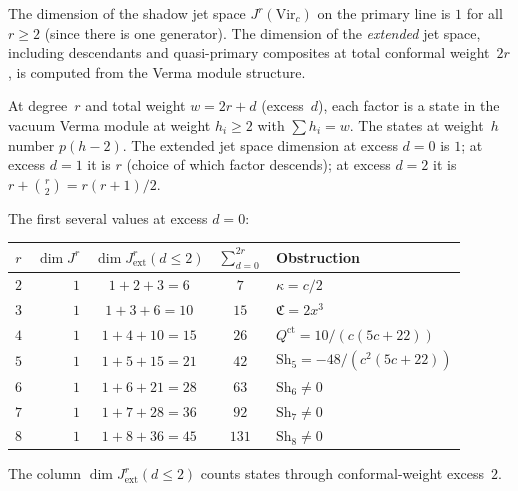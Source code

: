 \begin{computation}
The dimension of the shadow jet space $J^r(\mathrm{Vir}_c)$
on the primary line is $1$ for all $r \geq 2$ (since
there is one generator). The dimension of the
\emph{extended} jet space, including descendants and
quasi-primary composites at total conformal weight~$2r$,
is computed from the Verma module structure.

At degree~$r$ and total weight $w = 2r + d$ (excess~$d$),
each factor is a state in the vacuum Verma module at
weight $h_i \geq 2$ with $\sum h_i = w$. The states
at weight~$h$ number $p(h-2)$. The extended jet space
dimension at excess $d = 0$ is $1$; at excess $d = 1$ it
is $r$ (choice of which factor descends); at excess
$d = 2$ it is $r + \binom{r}{2} = r(r+1)/2$.

The first several values at excess $d = 0$:

\begin{center}
\renewcommand{\arraystretch}{1.4}
\begin{tabular}{crccl}
\toprule
$r$ & $\dim J^r$ & $\dim J^r_{\mathrm{ext}}(d{\leq}2)$
 & $\sum_{d=0}^{2r}$ & Obstruction \\
\midrule
$2$ & $1$ & $1 + 2 + 3 = 6$ & $7$
 & $\kappa = c/2$ \\
$3$ & $1$ & $1 + 3 + 6 = 10$ & $15$
 & $\mathfrak{C} = 2x^3$ \\
$4$ & $1$ & $1 + 4 + 10 = 15$ & $26$
 & $Q^{\mathrm{ct}} = 10/(c(5c{+}22))$ \\
$5$ & $1$ & $1 + 5 + 15 = 21$ & $42$
 & $\mathrm{Sh}_5 = -48/(c^2(5c{+}22))$ \\
$6$ & $1$ & $1 + 6 + 21 = 28$ & $63$
 & $\mathrm{Sh}_6 \neq 0$ \\
$7$ & $1$ & $1 + 7 + 28 = 36$ & $92$
 & $\mathrm{Sh}_7 \neq 0$ \\
$8$ & $1$ & $1 + 8 + 36 = 45$ & $131$
 & $\mathrm{Sh}_8 \neq 0$ \\
\bottomrule
\end{tabular}
\end{center}

\noindent The column $\dim J^r_{\mathrm{ext}}(d{\leq}2)$
counts states through conformal-weight excess~$2$.
\end{computation}

